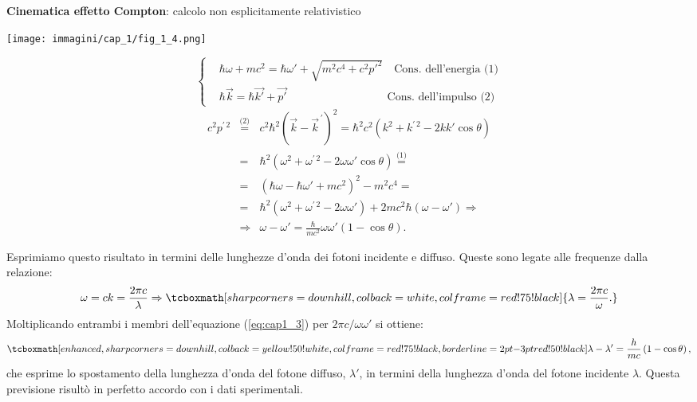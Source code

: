 \documentclass[a4paper,12pt,oneside]{book}
\begin{document}
\begin{center}
\begin{tcolorbox}[toprule=3mm, width=.9\textwidth, colback=white]
\textbf{Cinematica effetto Compton}: calcolo non esplicitamente relativistico\\
	\begin{center}
	\texttt{[image: immagini/cap\_1/fig\_1\_4.png]}
	\end{center}
	\begin{equation}
		\left\{
			\begin{aligned}
			&\hbar \omega +m c^2 = \hbar \omega ' +\sqrt{m^2 c^4 + c^2 p'^2}\quad \textrm{Cons. dell'energia (1)}\\
			& \hbar \vec{k} = \hbar \vec{k'} + \vec{p'}\qquad \qquad \qquad \qquad \quad \textrm{Cons. dell'impulso (2)}
			\end{aligned}
		\right.
	\end{equation}
	\begin{eqnarray}
		c^2 p^{\prime \, 2} &\overset{\textrm{(2)}}{=}& c^2\hbar^2 \left( \vec{k}- {\vec{k}	}^{\, \prime} \right) ^2 = \hbar ^2 c^2 \left(k^2+k^{\prime \, 2}-2kk' \cos \theta \right) \nonumber \\
		&=& \hbar ^2 \left(\omega ^2 + \omega^{\prime \, 2} - 2 \omega \omega ' \cos \theta  \right)\overset{\textrm{(1)}}{=} \nonumber \\
		&=& \left( \hbar \omega - \hbar \omega ' + m c^2 \right) ^2 - m^2 c^4= \nonumber \\
		&=& {\hbar}^2 \left({\omega}^2 + {\omega}^{\prime \, 2} - 2 \omega \omega ' \right) + 2 mc^2 \hbar ( \omega - \omega ' ) \Rightarrow \nonumber \\
		&\Rightarrow & \omega - \omega' =\frac{\hbar}{m c^2} \omega \omega ' \left( 1- \cos \theta \right).
	\end{eqnarray}
\end{tcolorbox}
\end{center}

Esprimiamo questo risultato in termini delle lunghezze d'onda dei fotoni incidente e diffuso. Queste sono legate alle frequenze dalla relazione:
	\begin{equation}
		\omega = c k =\frac{2 \pi c}{\lambda} \Rightarrow \tcboxmath[sharp corners=downhill ,colback=white,colframe=red!75!black]{\lambda =\frac{2 \pi c}{\omega}.}
	\end{equation}
Moltiplicando entrambi i membri dell'equazione (\ref{eq:cap1_3}) per $2 \pi c / \omega \omega '$ si ottiene:
	\begin{equation}
		\tcboxmath[enhanced,sharp corners=downhill ,colback=yellow!50!white,colframe=red!75!black, borderline={2pt}{-3pt}{red!50!black}]{
			\lambda - \lambda ' =\frac{h}{mc}\left( 1-\cos \theta \right),
			}
	\end{equation}
che esprime lo spostamento della lunghezza d'onda del fotone diffuso, $\lambda ' $, in termini della lunghezza d'onda del fotone incidente $\lambda$. Questa previsione risultò in perfetto accordo con i dati sperimentali.\\
\end{document}
